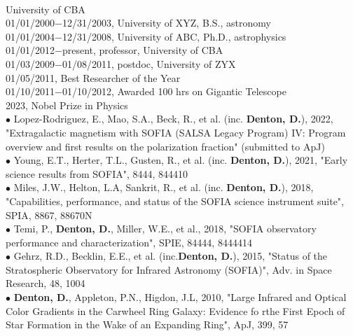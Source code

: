 %
\\
University of CBA
\mySectionSpacing
{}\\
01/01/2000$-$12/31/2003, University of XYZ, B.S., astronomy\\
01/01/2004$-$12/31/2008, University of ABC, Ph.D., astrophysics
\mySectionSpacing
{}\\
01/01/2012$-$present, professor, University of CBA\\
01/03/2009$-$01/08/2011, postdoc, University of ZYX
\mySectionSpacing
{}\\
01/05/2011, Best Researcher of the Year\\
01/10/2011$-$01/10/2012, Awarded 100 hrs on Gigantic Telescope\\
2023, Nobel Prize in Physics
\mySectionSpacing
{}\\
{\scriptsize{$\bullet$}} Lopez-Rodriguez, E., Mao, S.A., Beck, R., et al. (inc. \textbf{Denton, D.}), 2022, "Extragalactic magnetism with SOFIA (SALSA Legacy Program) IV: Program overview and first results on the polarization fraction" (submitted to ApJ)\\
{\scriptsize{$\bullet$}} Young, E.T., Herter, T.L., Gusten, R., et al. (inc. \textbf{Denton, D.}), 2021, "Early science results from SOFIA", 8444, 844410\\
{\scriptsize{$\bullet$}} Miles, J.W., Helton, L.A, Sankrit, R., et al. (inc. \textbf{Denton, D.}), 2018, "Capabilities, performance, and status of the SOFIA science instrument suite", SPIA, 8867, 88670N\\
{\scriptsize{$\bullet$}} Temi, P., \textbf{Denton, D.}, Miller, W.E., et al., 2018, "SOFIA observatory performance and characterization", SPIE, 84444, 8444414\\
{\scriptsize{$\bullet$}} Gehrz, R.D., Becklin, E.E., et al. (inc.\textbf{Denton, D.}), 2015, "Status of the Stratospheric Observatory for Infrared Astronomy (SOFIA)", Adv. in Space Research, 48, 1004\\
{\scriptsize{$\bullet$}} \textbf{Denton, D.}, Appleton, P.N., Higdon, J.L, 2010, "Large Infrared and Optical Color Gradients in the Carwheel Ring Galaxy: Evidence fo rthe First Epoch of Star Formation in the Wake of an Expanding Ring", ApJ, 399, 57
